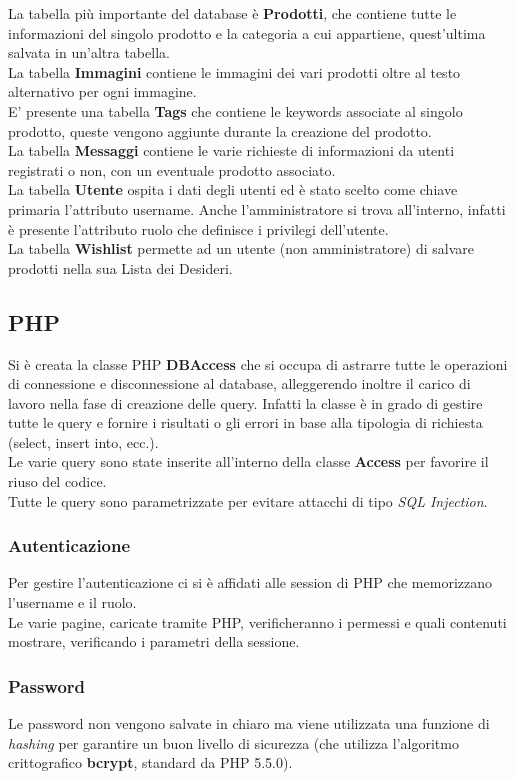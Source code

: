 \documentclass[a4paper, 11pt]{article}
\begin{document}
La tabella più importante del database è \textbf{Prodotti}, che contiene tutte le informazioni del singolo prodotto e la categoria a cui appartiene, quest’ultima salvata in un’altra tabella. \\
La tabella \textbf{Immagini} contiene le immagini dei vari prodotti oltre al testo alternativo per ogni immagine. \\
E’ presente una tabella \textbf{Tags} che contiene le keywords associate al singolo prodotto, queste vengono aggiunte durante la creazione del prodotto. \\
La tabella \textbf{Messaggi} contiene le varie richieste di informazioni da utenti registrati o non, con un eventuale prodotto associato.\\
La tabella \textbf{Utente} ospita i dati degli utenti ed è stato scelto come chiave primaria l’attributo username. 
Anche l’amministratore si trova all’interno, infatti è presente l’attributo ruolo che definisce i privilegi dell’utente. \\
La tabella \textbf{Wishlist} permette ad un utente (non amministratore) di salvare prodotti nella sua Lista dei Desideri.

\subsection{PHP}
Si è creata la classe PHP \textbf{DBAccess} che si occupa di astrarre tutte le operazioni di connessione e disconnessione al database, alleggerendo inoltre il carico di lavoro nella fase di creazione delle query.
Infatti la classe è in grado di gestire tutte le query e fornire i risultati o gli errori in base alla tipologia di richiesta (select, insert into, ecc.). \\
Le varie query sono state inserite all’interno della classe \textbf{Access} per favorire il riuso del codice.  \\
Tutte le query sono parametrizzate per evitare attacchi di tipo \textit{SQL Injection}.

\subsubsection{Autenticazione}
Per gestire l’autenticazione ci si è affidati alle session di PHP che memorizzano l’username e il ruolo. \\
Le varie pagine, caricate tramite PHP, verificheranno i permessi e quali contenuti mostrare, verificando i parametri della sessione. 

\subsubsection{Password}
Le password non vengono salvate in chiaro ma viene utilizzata una funzione di \textit{hashing} per garantire un buon livello di sicurezza (che utilizza l’algoritmo crittografico \textbf{bcrypt}, standard da PHP 5.5.0).
\end{document}
